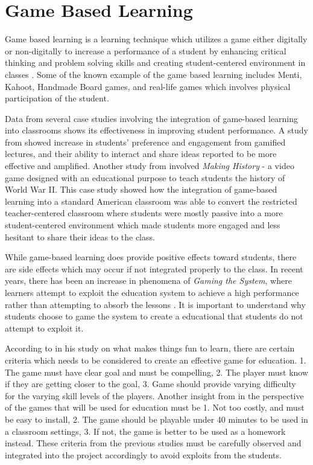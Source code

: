 \section{Game Based Learning}
Game based learning is a learning technique which utilizes a game either digitally or non-digitally to increase a performance of a student by enhancing critical thinking and problem solving skills and creating student-centered environment in classes \cite{tophat:tamosevicius}. Some of the known example of the game based learning includes Menti, Kahoot, Handmade Board games, and real-life games which involves physical participation of the student.

Data from several case studies involving the integration of game-based learning into classrooms shows its effectiveness in improving student performance. A study from \cite{gameOn} showed increase in students' preference and engagement from gamified lectures, and their ability to interact and share ideas reported to be more effective and amplified. Another study from \cite{watson2011} involved \textit{Making History} - a video game designed with an educational purpose to teach students the history of World War II. This case study showed how the integration of game-based learning into a standard American classroom was able to convert the restricted teacher-centered classroom where students were mostly passive into a more student-centered environment which made students more engaged and less hesitant to share their ideas to the class.  

While game-based learning does provide positive effects toward students, there are side effects which may occur if not integrated properly to the class. In recent years, there has been an increase in phenomena of \textit{Gaming the System}, where learners attempt to exploit the education system to achieve a high performance rather than attempting to absorb the lessons \cite{baker2008}. It is important to understand why students choose to game the system to create a educational that students do not attempt to exploit it.

According to \cite{malone1980fun} in his study on what makes things fun to learn, there are certain criteria which needs to be considered to create an effective game for education. 1. The game must have clear goal and must be compelling, 2. The player must know if they are getting closer to the goal, 3. Game should provide varying difficulty for the varying skill levels of the players. Another insight from \cite{mozelius2017} in the perspective of the games that will be used for education must be 1. Not too costly, and must be easy to install, 2. The game should be playable under 40 minutes to be used in a classroom settings, 3. If not, the game is better to be used as a homework instead. These criteria from the previous studies must be carefully observed and integrated into the project accordingly to avoid exploits from the students.  

